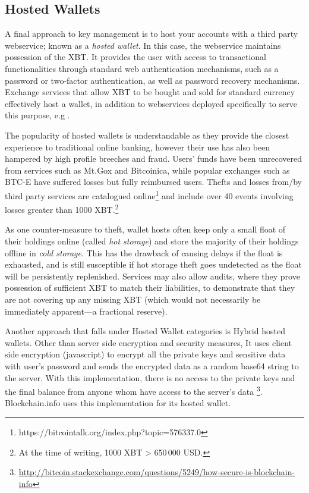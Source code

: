 \subsection{Hosted Wallets} 

A final approach to key management is to host your accounts with a third party webservice; known as a \textit{hosted wallet}. In this case, the webservice maintains possession of the XBT. It provides the user with access to transactional functionalities through standard web authentication mechanisms, such as a password or two-factor authentication, as well as password recovery mechanisms. Exchange services that allow XBT to be bought and sold for standard currency effectively host a wallet, in addition to webservices deployed specifically to serve this purpose, e.g \coinbase.

The popularity of hosted wallets is understandable as they provide the closest experience to traditional online banking, however their use has also been hampered by high profile breeches and fraud. Users' funds have been unrecovered from services such as Mt.Gox and Bitcoinica, while popular exchanges such as BTC-E have suffered losses but fully reimbursed users. Thefts and losses from/by third party services are catalogued online\footnote{https://bitcointalk.org/index.php?topic=576337.0} and include over 40 events involving losses greater than 1000 XBT.\footnote{At the time of writing, 1000 XBT > 650\,000 USD.}

As one counter-measure to theft, wallet hosts often keep only a small float of their holdings online (called \textit{hot storage}) and store the majority of their holdings offline in \textit{cold storage}. This has the drawback of causing delays if the float is exhausted, and is still susceptible if hot storage theft goes undetected as the float will be persistently replenished. Services may also allow audits, where they prove possession of sufficient XBT to match their liabilities, to demonstrate that they are not covering up any missing XBT (which would not necessarily be immediately apparent---\cf a fractional reserve).  

Another approach that falls under Hosted Wallet categories is Hybrid hosted wallets. Other than server side encryption and security measures, It uses client side encryption (javascript) to encrypt all the private keys and sensitive data with user's password and sends the encrypted data as a random base64 string to the server. With this implementation, there is no access to the private keys and the final balance from anyone whom have access to the server's data \footnote{\url{http://bitcoin.stackexchange.com/questions/5249/how-secure-is-blockchain-info}}. Blockchain.info uses this implementation for its hosted wallet.

